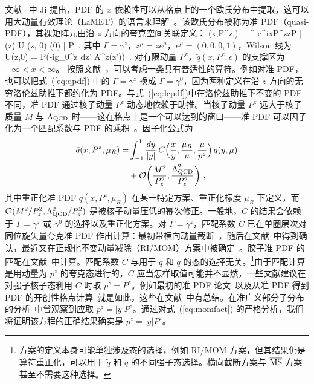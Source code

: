 文献~{\cite{Ji:2013dva}} 中 Ji 提出，PDF 的 $x$ 依赖性可以从格点上的一个欧氏分布中提取，这可以用大动量有效理论（LaMET）的语言来理解~\cite{Ji:2014gla}。该欧氏分布被称为准 PDF（quasi-PDF），其裸矩阵元由沿 $z$ 方向的夸克空间关联定义：
\beq \label{eq:qpdf}
	(x,P^z,\epsilon) \equiv \int_{-\infty}^ e^{ixP^zz}\langle P | \bar{\psi}  (z) \Gamma U (z, 0) \psi (0) | P \rangle \,,
\eeq
其中 $\Gamma=\gamma^z$，$z^\mu=ze^\mu$，$e^\mu=(0,0,0,1)$，Wilson 线为
\beq
	U(z,0) = P\exp\left(-ig\int_0^z dz' A^z(z')\right)\ .
\eeq
对有限动量 $P^z$，$\tilde{q}(x,P^z,\epsilon)$ 的支撑区为 $-\infty < x < \infty$。
按照文献~\cite{Hatta:2013gta}，可以考虑一类具有普适性的算符。例如对准 PDF，也可以把式~(\ref{eq:qpdf}) 中的 $\Gamma=\gamma^z$ 换成 $\Gamma=\gamma^0$，因为两种定义在沿 $z$ 方向的无穷洛伦兹助推下都约化为 PDF。与式~(\ref{eq:lcpdf})中在洛伦兹助推下不变的 PDF 不同，准 PDF 通过核子动量 $P^z$ 动态地依赖于助推。当核子动量 $P^z$ 远大于核子质量 $M$ 与 $\Lambda_{\rm QCD}$ 时——这在格点上是一个可以达到的窗口——准 PDF 可以因子化为一个匹配系数与 PDF 的乘积~\cite{Ji:2013dva,Ji:2014gla}。因子化公式为
\begin{align} \label{eq:momfact}
	\tilde{q}(x,P^z,\mu_R)
	=& \int_{-1}^1 {dy\over |y|}\: C\Bigl({x\over y},{\mu_R\over \mu},{\mu\over p^z}\Bigr) \, q(y,\mu)
	\\
	& + \mathcal{O}\biggl({M^2\over P_z^2},{\Lambda_{\ensuremath{\operatorname{QCD}}}^2\over P_z^2}\biggr)\ ,\nn
\end{align}
其中重正化准 PDF $\tilde{q}(x,P^z,\mu_R)$ 在某一特定方案、重正化标度 $\mu_R$ 下定义，而 $\mathcal{O}(M^2/P_z^2, \Lambda_{\rm QCD}^2/P_z^2)$ 是被核子动量压低的幂次修正。一般地，$C$ 的结果会依赖于 $\Gamma=\gamma^z$ 或 $\gamma^0$ 的选择以及重正化方案。对 $\Gamma=\gamma^z$，匹配系数 $C$ 已在单圈层次对同位旋矢量夸克准 PDF 作出计算：最初带横向动量截断~\cite{Xiong:2013bka}，随后在文献~\cite{Ma:2014jla,Alexandrou:2015rja}中得到确认，最近又在正规化不变动量减除（RI/MOM）方案中被确定~\cite{Stewart:2017tvs}。胶子准 PDF 的匹配在文献~\cite{Wang:2017qyg,Wang:2017eel}中计算。匹配系数 $C$ 与用于 $\tilde q$ 和 $q$ 的态的选择无关。\footnote{方案的定义本身可能单独涉及态的选择，例如 RI/MOM 方案，但其结果仍是算符重正化，可以用于 $\tilde q$ 和 $q$ 的不同强子态选择。横向截断方案与 $\overline{\rm MS}$ 方案甚至不需要这种选择。}由于匹配计算是用动量为 $p^z$ 的夸克态进行的，$C$ 应当怎样取值可能并不显然，一些文献建议在对强子核子态利用 $C$ 时取 $p^z=P^z$。例如最初的准 PDF 论文~\cite{Ji:2013dva,Ji:2014gla,Xiong:2013bka}以及从准 PDF 得到 PDF 的开创性格点计算~\cite{Lin:2014zya,Alexandrou:2015rja,Chen:2016utp,Alexandrou:2016jqi,Zhang:2017bzy,Alexandrou:2017huk,Chen:2017mzz,Lin:2017ani,Chen:2017gck}就是如此，这些在文献~\cite{Lin:2017snn}中有总结。在准广义部分子分布的分析~\cite{Ji:2015qla}中曾观察到应取 $p^z=|y|P^z$。通过对式~(\ref{eq:momfact}) 的严格分析，我们将证明该方程的正确结果确实是 $p^z=|y|P^z$。

